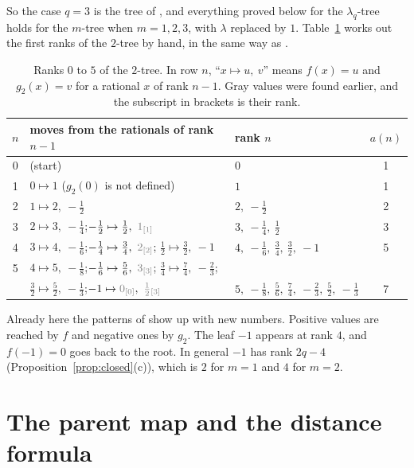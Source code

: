 So the case $q=3$ is the tree of \cite{P137}, and everything proved below for the $\lambda_q$-tree
holds for the $m$-tree when $m=1,2,3$, with $\lambda$ replaced by $1$. Table~\ref{tab:hand} works out
the first ranks of the $2$-tree by hand, in the same way as \cite[Table~1]{P137}.

\begin{table}[ht]
\centering\small
\renewcommand{\arraystretch}{1.2}
\begin{tabular}{@{}c l l c@{}}
\toprule
$n$ & moves from the rationals of rank $n-1$ & rank $n$ & $a(n)$\\
\midrule
0 & (start) & $0$ & 1\\
1 & $0\mapsto 1$ \quad ($g_2(0)$ is not defined) & $1$ & 1\\
2 & $1\mapsto 2,\ -\tfrac12$ & $2,\ -\tfrac12$ & 2\\
3 & $2\mapsto 3,\ -\tfrac14$;\quad $-\tfrac12\mapsto \tfrac12,\ \old{1}{1}$ & $3,\ -\tfrac14,\ \tfrac12$ & 3\\
4 & $3\mapsto 4,\ -\tfrac16$;\quad $-\tfrac14\mapsto \tfrac34,\ \old{2}{2}$;\quad
  $\tfrac12\mapsto\tfrac32,\ -1$ & $4,\ -\tfrac16,\ \tfrac34,\ \tfrac32,\ -1$ & 5\\
5 & $4\mapsto 5,\ -\tfrac18$;\quad $-\tfrac16\mapsto\tfrac56,\ \old{3}{3}$;\quad
  $\tfrac34\mapsto\tfrac74,\ -\tfrac23$; & & \\
  & $\tfrac32\mapsto\tfrac52,\ -\tfrac13$;\quad $-1\mapsto\old{0}{0},\ \old{\tfrac12}{3}$ &
  $5,\ -\tfrac18,\ \tfrac56,\ \tfrac74,\ -\tfrac23,\ \tfrac52,\ -\tfrac13$ & 7\\
\bottomrule
\end{tabular}
\caption{Ranks $0$ to $5$ of the $2$-tree. In row $n$, ``$x\mapsto u,\ v$'' means $f(x)=u$ and
$g_2(x)=v$ for a rational $x$ of rank $n-1$. Gray values were found earlier, and the subscript in
brackets is their rank.}
\label{tab:hand}
\end{table}

Already here the patterns of \cite{P137} show up with new numbers. Positive values are reached by $f$
and negative ones by $g_2$. The leaf $-1$ appears at rank $4$, and $f(-1)=0$ goes back to the root.
In general $-1$ has rank $2q-4$ (Proposition~\ref{prop:closed}(c)), which is $2$ for $m=1$ and $4$
for $m=2$.

\section{The parent map and the distance formula}\label{sec:parent}

